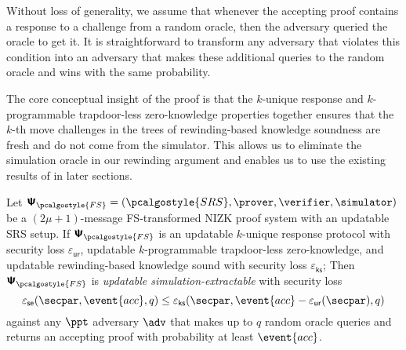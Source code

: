 \documentclass[10pt]{llncs}
\newcommand{\SRScer}{\pcalgostyle{SRS}}
\newcommand{\pcvarstyle}[1]{\mathsf{#1}}
\newcommand{\eps}{\varepsilon}
\newcommand{\zkproof}{\pi}
\newcommand{\proofsystem}{\pcschemestyle{\Psi}}
\newcommand{\psfs}{\proofsystem_\fs}
\newcommand{\fs}{\pcalgostyle{FS}}
\newcommand{\pcschemestyle}[1]{\bm{\mathsf{#1}}}
\newcommand{\accProb}{\event{acc}}
\newcommand{\advse}{\adv}
\newcommand{\epsur}{\eps_\pcvarstyle{ur}}
\newcommand{\epscss}{\eps_{\pcvarstyle{ks}}}
\newcommand{\epsse}{\eps_{\pcvarstyle{se}}}
\begin{document}
Without loss of generality, we assume that whenever the accepting proof contains a
response to a challenge from a random oracle, then the adversary queried the oracle
to get it. It is straightforward to transform any adversary that violates this
condition into an adversary that makes these additional queries to the random oracle
and wins with the same probability.

The core conceptual insight of the proof is that the $k$-unique response  and $k$-programmable trapdoor-less zero-knowledge properties together ensures that the $k$-th move challenges in the trees of rewinding-based knowledge soundness are fresh and do not come from the simulator. This allows us to eliminate the simulation oracle in our rewinding argument and enables us to use the existing results of \cite{EPRINT:AttFehKlo21} in later sections.


\begin{theorem}
	\label{thm:se}
	Let $\psfs = (\SRScer, \prover, \verifier, \simulator)$ be a  $(2\mu + 1)$-message FS-transformed NIZK proof system with an updatable SRS setup. If $\psfs$ is an
	updatable $k$-unique response protocol with security loss $\epsur$,
	updatable $k$-programmable trapdoor-less zero-knowledge, and %
	updatable rewinding-based knowledge sound with security loss $\epscss$; 
	Then $\psfs$ is \emph{updatable simulation-extractable} with security loss $$\epsse(\secpar,\accProb,q) \leq \epscss(\secpar,\accProb - \epsur(\secpar),q)$$ against any $\ppt$ adversary $\advse$ that makes up to $q$ random oracle queries and returns an accepting proof with probability at least $\accProb$.
\end{theorem}
\end{document}
